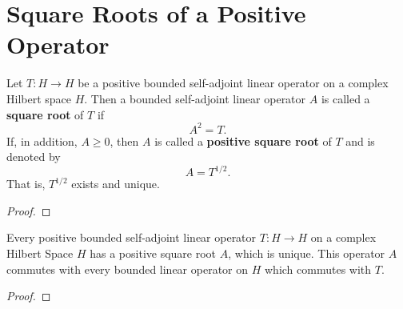 \section{Square Roots of a Positive Operator}

\begin{theorem}
    Let \( T: H \to H  \) be a positive bounded self-adjoint linear operator on a complex Hilbert space \( H  \). Then a bounded self-adjoint linear operator \( A  \) is called a \textbf{square root} of \( T  \) if  
    \[  A^{2} = T.  \]
    If, in addition, \( A \geq 0  \), then \( A  \) is called a \textbf{positive square root} of \( T  \) and is denoted by
    \[  A = T^{1/2}. \]
    That is, \( T^{1/2}  \) exists and unique.
\end{theorem}
\begin{proof}

\end{proof}
\begin{theorem}\label{9.4-2}
Every positive bounded self-adjoint linear operator \( T: H \to H  \) on a complex Hilbert Space \( H  \) has a positive square root \( A  \), which is unique. This operator \( A  \) commutes with every bounded linear operator on \( H  \) which commutes with \( T  \).    
\end{theorem}
\begin{proof}

\end{proof}
